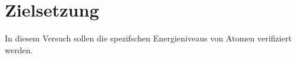 \section{Zielsetzung}
\label{sec:Zielsetzung}


In diesem Versuch sollen die spezifschen Energieniveaus von Atomen verifiziert werden.